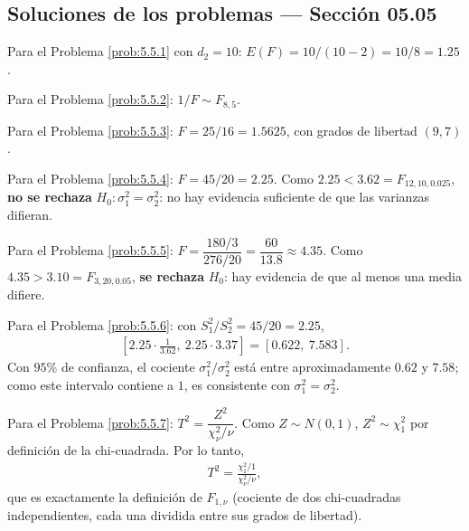 \subsection*{Soluciones de los problemas --- Sección 05.05}

\begin{solucion}
	\label{sol:5.5.1}
	Para el Problema \ref{prob:5.5.1} con $d_2=10$: $E(F) = 10/(10-2) = 10/8 = 1.25$. \quad \qedhere
\end{solucion}

\begin{solucion}
	\label{sol:5.5.2}
	Para el Problema \ref{prob:5.5.2}: $1/F \sim F_{8,5}$. \quad \qedhere
\end{solucion}

\begin{solucion}
	\label{sol:5.5.3}
	Para el Problema \ref{prob:5.5.3}: $F = 25/16 = 1.5625$, con grados de libertad $(9,7)$. \quad \qedhere
\end{solucion}

\begin{solucion}
	\label{sol:5.5.4}
	Para el Problema \ref{prob:5.5.4}: $F = 45/20 = 2.25$. Como $2.25 < 3.62 = F_{12,10,0.025}$, \textbf{no se rechaza} $H_0:\sigma_1^2=\sigma_2^2$: no hay evidencia suficiente de que las varianzas difieran. \quad \qedhere
\end{solucion}

\begin{solucion}
	\label{sol:5.5.5}
	Para el Problema \ref{prob:5.5.5}: $F = \dfrac{180/3}{276/20} = \dfrac{60}{13.8} \approx 4.35$. Como $4.35 > 3.10 = F_{3,20,0.05}$, \textbf{se rechaza} $H_0$: hay evidencia de que al menos una media difiere. \quad \qedhere
\end{solucion}

\begin{solucion}
	\label{sol:5.5.6}
	Para el Problema \ref{prob:5.5.6}: con $S_1^2/S_2^2 = 45/20 = 2.25$,
	\begin{align*}
		\left[2.25\cdot\frac{1}{3.62},\ 2.25\cdot 3.37\right] = [0.622,\ 7.583].
	\end{align*}
	Con $95\%$ de confianza, el cociente $\sigma_1^2/\sigma_2^2$ está entre aproximadamente $0.62$ y $7.58$; como este intervalo contiene a $1$, es consistente con $\sigma_1^2=\sigma_2^2$. \quad \qedhere
\end{solucion}

\begin{solucion}
	\label{sol:5.5.7}
	Para el Problema \ref{prob:5.5.7}: $T^2 = \dfrac{Z^2}{\chi^2_\nu/\nu}$. Como $Z\sim N(0,1)$, $Z^2\sim\chi^2_1$ por definición de la chi-cuadrada. Por lo tanto,
	\begin{align*}
		T^2 = \frac{\chi^2_1/1}{\chi^2_\nu/\nu},
	\end{align*}
	que es exactamente la definición de $F_{1,\nu}$ (cociente de dos chi-cuadradas independientes, cada una dividida entre sus grados de libertad). \quad \qedhere
\end{solucion}

